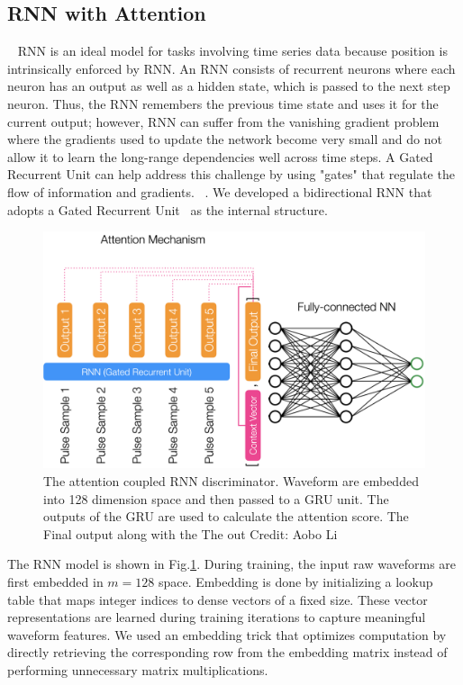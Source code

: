 \subsection{RNN with Attention}~\label{subapp:RNN}
RNN is an ideal model for tasks involving time series data because position is intrinsically enforced by RNN. \cite{Rumelhart1986} An RNN consists of recurrent neurons where each neuron has an output as well as a hidden state, which is passed to the next step neuron. Thus, the RNN remembers the previous time state and uses it for the current output; however, RNN can suffer from the vanishing gradient problem where the gradients used to update the network become very small and do not allow it to learn the long-range dependencies well across time steps. A Gated Recurrent Unit can help address this challenge by using "gates" that regulate the flow of information and gradients. ~\cite{GRU}. We developed a bidirectional RNN that adopts a Gated Recurrent Unit~\cite{GRU} as the internal structure.


\begin{figure}[htb!]
    \centering
    \includegraphics[width=0.7\linewidth,trim={0pc 0pc 0pc 0pc},clip]{ch6/figs/rnnAttention.png}
    \caption{The attention coupled RNN discriminator. Waveform are embedded into 128 dimension space and then passed to a GRU unit. The outputs of the GRU are used to calculate the attention score. The Final output along with the   The out Credit: Aobo Li}
    \label{ch6_fig_detail_network}
\end{figure}

The RNN model is shown in Fig.\ref{ch6_fig_detail_network}. During training, the input raw waveforms are first embedded in $m=128$ space. Embedding is done by initializing a lookup table that maps integer indices to dense vectors of a fixed size. These vector representations are learned during training iterations to capture meaningful waveform features. We used an embedding trick that optimizes computation by directly retrieving the corresponding row from the embedding matrix instead of performing unnecessary matrix multiplications. 


